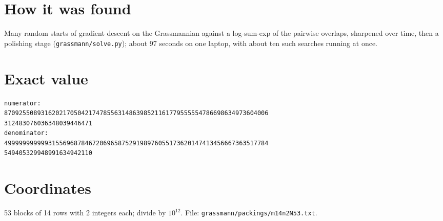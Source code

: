 \documentclass[11pt,a4paper]{article}
\begin{document}
\section{How it was found}
Many random starts of gradient descent on the Grassmannian against a log-sum-exp of the pairwise overlaps, sharpened over time, then a polishing stage (\texttt{grassmann/solve.py}); about 97 seconds on one laptop, with about ten such searches running at once.


\appendix
\section{Exact value}
{\small
\begin{verbatim}
numerator:
870925508931620217050421747855631486398521161779555554786698634973604006
312483076036348039446471
denominator:
499999999999315569687846720696587529198976055173620147413456667363517784
549405329948991634942110
\end{verbatim}}

\section{Coordinates}
53 blocks of 14 rows with 2 integers each; divide by $10^{12}$. File: \texttt{grassmann/packings/m14n2N53.txt}.
{\tiny
\begin{multicols}{4}
\end{multicols}}
\end{document}
